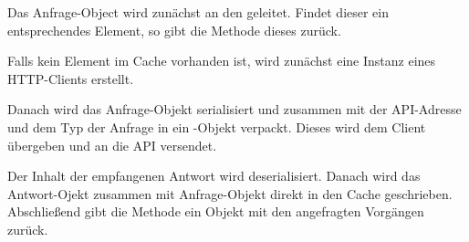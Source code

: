 Das Anfrage-Object wird zunächst an den  geleitet.
Findet dieser ein entsprechendes Element, so gibt die Methode dieses zurück.


Falls kein Element im Cache vorhanden ist, wird zunächst eine Instanz eines \acs{HTTP}-Clients
erstellt. 


Danach wird das Anfrage-Objekt serialisiert und zusammen mit der \acs{API}-Adresse
und dem Typ der Anfrage in ein -Objekt verpackt. 
Dieses wird dem Client übergeben und an die API versendet.


Der Inhalt der empfangenen Antwort wird deserialisiert. Danach wird
das Antwort-Ojekt zusammen mit Anfrage-Objekt direkt in den Cache geschrieben.
Abschließend gibt die Methode  ein Objekt mit den
angefragten Vorgängen zurück.
